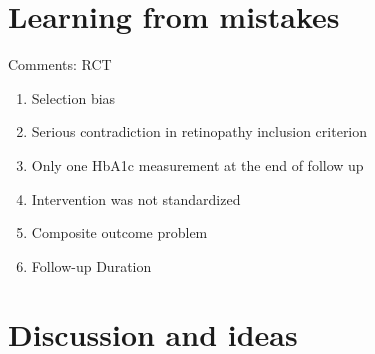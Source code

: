 \documentclass[
  14pt,
  ignorenonframetext,
  aspectratio=169,
]{beamer}
\begin{document}
\section{Learning from mistakes}\label{learning-from-mistakes}

\begin{frame}{Comments: RCT}
\protect{}\label{comments-rct}
\begin{enumerate}
\item
  Selection bias
\item
  Serious contradiction in retinopathy inclusion criterion
\item
  Only one HbA1c measurement at the end of follow up
\item
  Intervention was not standardized
\item
  Composite outcome problem
\item
  Follow-up Duration
\end{enumerate}
\end{frame}

\section{Discussion and ideas}\label{discussion-and-ideas}
\end{document}
